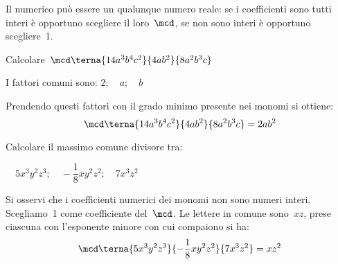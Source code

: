 Il  numerico può essere un qualunque 
numero reale: se i coefficienti sono tutti interi è opportuno scegliere 
il loro~\(\mcd\), se non sono interi è opportuno scegliere~1.

% 
% 

% 
% 

\begin{esempio}{}{}
Calcolare~\(\mcd \terna{14a^{3}b^{4}c^{2}}{4ab^{2}}{8a^{2}b^{3}c}\) 

I fattori comuni sono: \quad 
\(2; \quad a; \quad b\)

Prendendo questi fattori con il grado minimo presente nei monomi 
si ottiene:
\[\mcd \terna{14a^{3}b^{4}c^{2}}{4ab^{2}}{8a^{2}b^{3}c}=2ab^{2}\]
\end{esempio}

\begin{esempio}{}{}
Calcolare il massimo comune divisore tra: 

\(\quad 5x^{3}y^{2}z^{3}; \quad -\dfrac{1}{8}xy^{2}z^{2}; 
  \quad 7x^{3}z^{2}\)

Si osservi che i coefficienti numerici dei monomi non sono numeri interi.
Scegliamo~1 come coefficiente del~\(\mcd\).
Le lettere in comune sono~\(xz\), prese ciascuna con
l'esponente minore con cui compaiono si ha:
\[\mcd \terna{5x^{3}y^{2}z^{3}}{-\frac{1}{8}xy^{2}z^{2}}{7x^{3}z^{2}} = 
  xz^{2}\]
\end{esempio}


